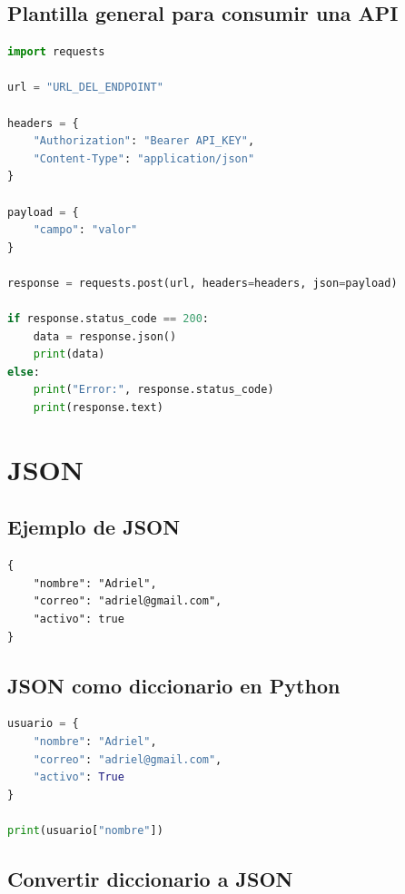\documentclass[12pt]{article}
\begin{document}
\subsection{Plantilla general para consumir una API}

\begin{lstlisting}[language=Python]
import requests

url = "URL_DEL_ENDPOINT"

headers = {
    "Authorization": "Bearer API_KEY",
    "Content-Type": "application/json"
}

payload = {
    "campo": "valor"
}

response = requests.post(url, headers=headers, json=payload)

if response.status_code == 200:
    data = response.json()
    print(data)
else:
    print("Error:", response.status_code)
    print(response.text)
\end{lstlisting}

\section{JSON}

\subsection{Ejemplo de JSON}

\begin{lstlisting}
{
    "nombre": "Adriel",
    "correo": "adriel@gmail.com",
    "activo": true
}
\end{lstlisting}

\subsection{JSON como diccionario en Python}

\begin{lstlisting}[language=Python]
usuario = {
    "nombre": "Adriel",
    "correo": "adriel@gmail.com",
    "activo": True
}

print(usuario["nombre"])
\end{lstlisting}

\subsection{Convertir diccionario a JSON}
\end{document}
